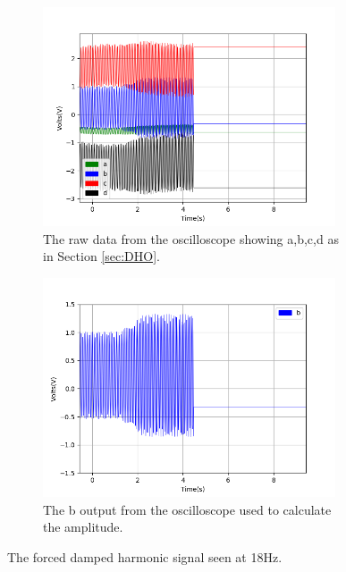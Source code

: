 \begin{figure}[h!]
\centering
\begin{subfigure}[t]{.475\textwidth}
  \centering
  \includegraphics[width=0.95\textwidth, height=0.20\textheight]{figures/FDHO/scope_43raw.png}
  \caption{The raw data from the oscilloscope showing a,b,c,d as in Section \ref{sec:DHO}.}
 \label{fig:FDHO_18Hz_raw}
\end{subfigure}\hfill
\begin{subfigure}[t]{.475\textwidth}
  \centering
  \includegraphics[width=0.95\textwidth, height=0.20\textheight]{figures/FDHO/scope_43v_2.png}
  \caption{The b output from the oscilloscope used to calculate the amplitude.}
\label{fig:FDHO_18Hz_b}
\end{subfigure}
\caption{The forced damped harmonic signal seen at 18Hz.}
\label{fig:FDHO_18Hz}
\end{figure}

